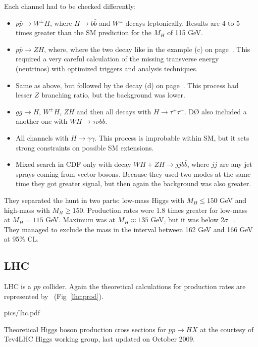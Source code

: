 Each channel had to be checked differently:
\begin{itemize}
	\item $p\bar{p} \to W^\pm H$, where $H \to b\bar{b}$ and $W^\pm$ decays leptonically. Results are 4 to 5 times greater
		than the SM prediction for the $M_H$ of 115 GeV.
	\item $p\bar{p} \to ZH$, where, where the two decay like in the example (c) on page~\pageref{higgs:decay}. This required
		a very careful calculation of the missing transverse energy (neutrinos) with optimized triggers and analysis
		techniques.
	\item Same as above, but followed by the decay (d) on page~\pageref{higgs:decay}. This process had lesser $Z$ branching
		ratio, but the background was lower.
	\item $gg \to H$, $W^{\pm}H$, $ZH$ and then all decays with $H \to \tau^+\tau^-$. D\O{} also included a another one with
		$WH \to \tau\nu b\bar{b}$.
	\item All channels with $H \to \gamma\gamma$. This process is improbable within SM, but it sets strong constraints on
		possible SM extensions.
	\item Mixed search in CDF only with decay $WH + ZH \to jjb\bar{b}$, where $jj$ are any jet sprays coming from vector bosons.
		Because they used two modes at the same time they got greater signal, but then again the background was also
		greater.
\end{itemize}

They separated the hunt in two parts: low-mass Higgs with $M_H \leq 150$ GeV and high-mass with $M_H \geq 150$. Production rates
were 1.8 times greater for low-mass at  $M_H = 115$ GeV. Maximum was at $M_H \approx 135$ GeV, but it was below 2$\sigma$
~\cite[pg. 15]{higgs:review}. They managed to exclude the mass in the interval between 162 GeV and 166 GeV at 95\% CL.

\subsection{LHC}

LHC is a $pp$ collider. Again the theoretical calculations for production rates are represented by~\cite{tev4lhc}
(Fig~\ref{lhc:prod}).

\begin{myfig}{pics/lhc.pdf}
	\caption{Theoretical Higgs boson production cross sections for $pp \to HX$ at the courtesy of Tev4LHC Higgs working group,
		last updated on October 2009.}
	\label{lhc:prod}
\end{myfig}


